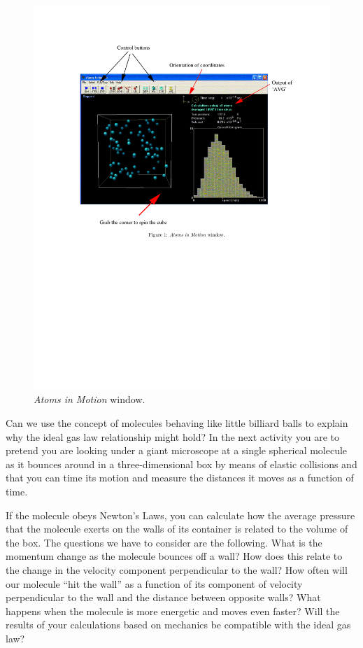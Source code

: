 \begin{figure}[hbt]
\begin{center}
\includegraphics{kin_theory_ideal/am4a.pdf}
\caption{\textit{Atoms in Motion} window.}
\end{center}
\end{figure}


Can we use the concept of molecules behaving like little billiard
balls to explain why the ideal gas law relationship might hold? In
the next activity you are to pretend you are looking under a giant
microscope at a single spherical molecule as it bounces around in
a three-dimensional box by means of elastic collisions and that you
can time its motion and measure the distances it moves as a function
of time. 

If the molecule obeys Newton's Laws, you can calculate how the average
pressure that the molecule exerts on the walls of its container is
related to the volume of the box. The questions we have to consider
are the following. What is the momentum change as the
molecule bounces off a wall? How does this relate to the change in
the velocity component perpendicular to the wall? How often will our
molecule ``hit the wall'' as a function of its component
of velocity perpendicular to the wall and the distance between opposite
walls? What happens when the molecule is more energetic and moves
even faster? Will the results of your calculations based on mechanics
be compatible with the ideal gas law?

